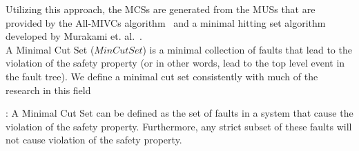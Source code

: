 Utilizing this approach, the MCSs are generated from the MUSs that are provided by the All-MIVCs algorithm~\cite{Ghassabani2017EfficientGO} and a minimal hitting set algorithm developed by Murakami et. al.~\cite{murakami2013efficient,gainer2017minimal}. \\

A Minimal Cut Set ($MinCutSet$) is a minimal collection of faults that lead to the violation of the safety property (or in other words, lead to the top level event in the fault tree). We define a minimal cut set consistently with much of the research in this field~\cite{0f356f05e72f43018211b36f97c8854a,historyFTA}

\begin{definition} :  A Minimal Cut Set can be defined as the set of faults in a system that cause the violation of the safety property. Furthermore, any strict subset of these faults will not cause violation of the safety property. 
\end{definition}







